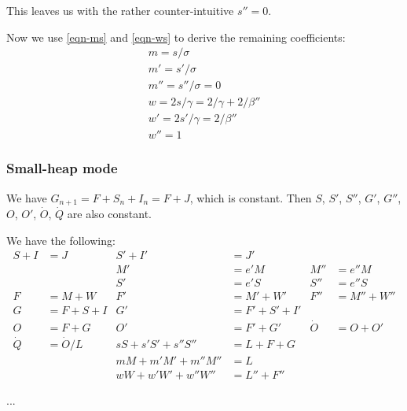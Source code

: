 \documentclass{article}
\begin{document}
This leaves us with the rather counter-intuitive $s'' = 0$.

\bigskip

Now we use \eqref{eqn-ms} and \eqref{eqn-ws} to derive the remaining
coefficients:
\begin{gather}
m = s/\sigma \\
m' = s'/\sigma \\
m'' = s''/\sigma = 0 \\
w = 2s/\gamma = 2/\gamma + 2/\beta''\\
w' = 2s'/\gamma = 2/\beta''\\
w'' = 1
\end{gather}


\subsubsection{Small-heap mode}


We have $G_{n+1} = F + S_n + I_n = F + J$, which is constant. Then $S$,
$S'$, $S''$, $G'$, $G''$, $O$, $O'$, $\dot{O}$, $\dot{Q}$
are also constant.

We have the following:
\begin{align*}
S+I &= J & S'+I' &= J' \\
 & & M' &= e'M  &  M'' &= e''M \\
 & & S' &= e'S  &  S'' &= e''S \\
F &= M + W  &  F' &= M' + W'  &  F'' &= M'' + W'' \\
G &= F + S + I  &  G' &= F' + S' + I' \\
O &= F + G  &  O' &= F' + G' & \dot{O} &= O + O' \\
\dot{Q} &= \dot{O}/L  & sS + s'S' + s''S'' &= L + F + G \\
             &         &  mM + m'M' + m''M'' &= L \\
             &         &  wW + w'W' + w''W'' &= L'' + F''
\end{align*}

...
\end{document}
